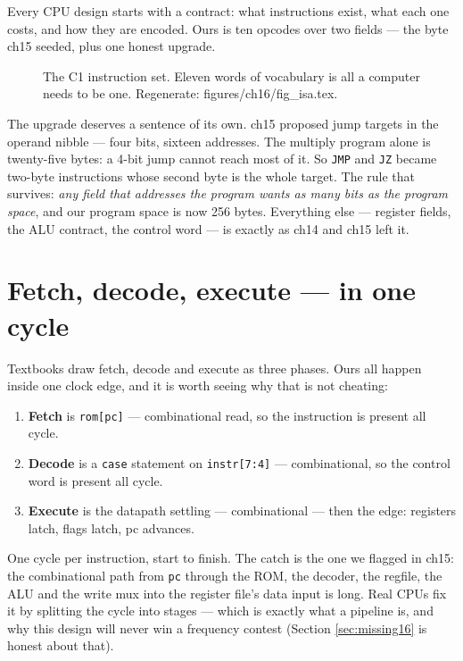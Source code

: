Every CPU design starts with a contract: what instructions exist,
what each one costs, and how they are encoded. Ours is ten opcodes
over two fields --- the byte ch15 seeded, plus one honest upgrade.

\begin{figure}[htbp]
\centering

\caption{The C1 instruction set. Eleven words of vocabulary is all a
computer needs to be one. Regenerate: \ttfamily
figures/ch16/fig\_isa.tex.}
\label{fig:isa16}
\end{figure}

The upgrade deserves a sentence of its own. ch15 proposed jump
targets in the operand nibble --- four bits, sixteen addresses. The
multiply program alone is twenty-five bytes: a 4-bit jump cannot
reach most of it. So \texttt{JMP} and \texttt{JZ} became two-byte
instructions whose second byte is the whole target. The rule that
survives: \emph{any field that addresses the program wants as many
bits as the program space}, and our program space is now 256 bytes.
Everything else --- register fields, the ALU contract, the control
word --- is exactly as ch14 and ch15 left it.

\section{Fetch, decode, execute --- in one cycle}\label{sec:fde16}

Textbooks draw fetch, decode and execute as three phases. Ours all
happen inside one clock edge, and it is worth seeing why that is not
cheating:

\begin{enumerate}
\item \textbf{Fetch} is \texttt{rom[pc]} --- combinational read, so
the instruction is present all cycle.
\item \textbf{Decode} is a \texttt{case} statement on
\texttt{instr[7:4]} --- combinational, so the control word is present
all cycle.
\item \textbf{Execute} is the datapath settling --- combinational ---
then the edge: registers latch, flags latch, pc advances.
\end{enumerate}

One cycle per instruction, start to finish. The catch is the one we
flagged in ch15: the combinational path from \texttt{pc} through the
ROM, the decoder, the regfile, the ALU and the write mux into the
register file's data input is long. Real CPUs fix it by splitting the
cycle into stages --- which is exactly what a pipeline is, and why
this design will never win a frequency contest (Section
\ref{sec:missing16} is honest about that).

